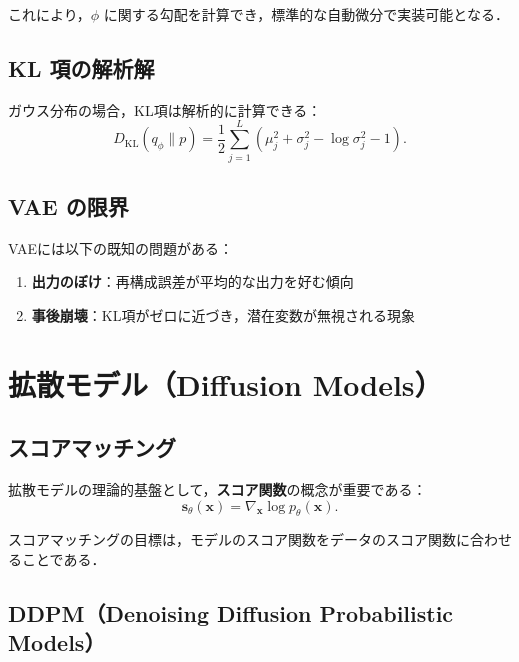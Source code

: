 これにより，$\phi$ に関する勾配を計算でき，標準的な自動微分で実装可能となる．

\subsection{KL 項の解析解}

ガウス分布の場合，KL項は解析的に計算できる：
\begin{equation}
  D_{\mathrm{KL}}(q_\phi \| p) = \frac{1}{2} \sum_{j=1}^L \left(\mu_j^2 + \sigma_j^2 - \log \sigma_j^2 - 1\right).
  \label{eq:kl-gaussian}
\end{equation}

\subsection{VAE の限界}

VAEには以下の既知の問題がある：
\begin{enumerate}
  \item \textbf{出力のぼけ}：再構成誤差が平均的な出力を好む傾向
  \item \textbf{事後崩壊}：KL項がゼロに近づき，潜在変数が無視される現象
\end{enumerate}

\section{拡散モデル（Diffusion Models）}
\label{sec:diffusion}

\subsection{スコアマッチング}

拡散モデルの理論的基盤として，\textbf{スコア関数}の概念が重要である：
\begin{equation}
  \mathbf{s}_\theta(\boldsymbol{x}) = \nabla_{\boldsymbol{x}} \log p_\theta(\boldsymbol{x}).
  \label{eq:score}
\end{equation}

スコアマッチングの目標は，モデルのスコア関数をデータのスコア関数に合わせることである．

\subsection{DDPM（Denoising Diffusion Probabilistic Models）}

